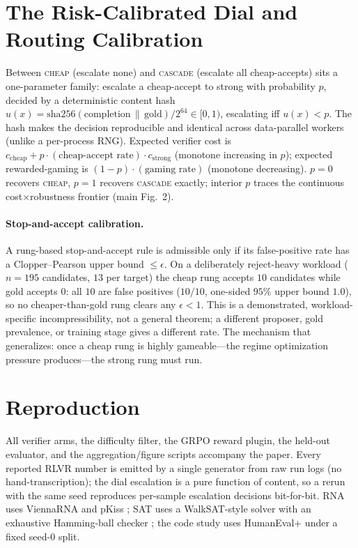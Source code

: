 \documentclass[letterpaper]{article} %
\begin{document}
\section{The Risk-Calibrated Dial and Routing Calibration}\label{supp:dial}
Between \textsc{cheap} (escalate none) and \textsc{cascade} (escalate all cheap-accepts) sits a one-parameter
family: escalate a cheap-accept to strong with probability $p$, decided by a deterministic content hash
$u(x)=\mathrm{sha256}(\text{completion}\,\|\,\text{gold})/2^{64}\in[0,1)$, escalating iff $u(x)<p$. The hash
makes the decision reproducible and identical across data-parallel workers (unlike a per-process RNG). Expected
verifier cost is $c_{\mathrm{cheap}}+p\cdot(\text{cheap-accept rate})\cdot c_{\mathrm{strong}}$ (monotone
increasing in $p$); expected rewarded-gaming is $(1-p)\cdot(\text{gaming rate})$ (monotone decreasing).
$p{=}0$ recovers \textsc{cheap}, $p{=}1$ recovers \textsc{cascade} exactly; interior $p$ traces the continuous
cost$\times$robustness frontier (main Fig.~2). \paragraph{Stop-and-accept calibration.} A rung-based
stop-and-accept rule is admissible only if its false-positive rate has a Clopper--Pearson
\citep{clopperpearson1934} upper bound $\le\epsilon$. On a deliberately reject-heavy workload ($n{=}195$
candidates, $13$ per target) the cheap rung accepts $10$ candidates while gold accepts $0$: all $10$ are false
positives ($10/10$, one-sided $95\%$ upper bound $1.0$), so no cheaper-than-gold rung clears any $\epsilon<1$.
This is a demonstrated, workload-specific incompressibility, not a general theorem; a different proposer, gold
prevalence, or training stage gives a different rate. The mechanism that generalizes: once a cheap rung is
highly gameable---the regime optimization pressure produces---the strong rung must run.

\section{Reproduction}\label{supp:repro}
All verifier arms, the difficulty filter, the GRPO reward plugin, the held-out evaluator, and the
aggregation/figure scripts accompany the paper. Every reported RLVR number is emitted by a single generator
from raw run logs (no hand-transcription); the dial escalation is a pure function of content, so a rerun with
the same seed reproduces per-sample escalation decisions bit-for-bit. RNA uses ViennaRNA
\citep{lorenz2011viennarna} and pKiss \citep{janssen2015pkiss}; SAT uses a WalkSAT-style solver
\citep{selman1994walksat} with an exhaustive Hamming-ball checker \citep{ardelius2008exhaustive}; the code
study uses HumanEval+ \citep{evalplus} under a fixed seed-$0$ split.



\end{document}
